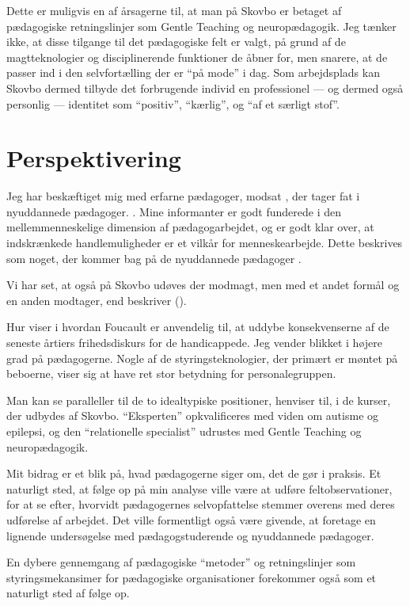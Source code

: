 Dette er muligvis en af årsagerne til, at man på Skovbo er betaget af pædagogiske retningslinjer som Gentle Teaching og neuropædagogik.
Jeg tænker ikke, at disse tilgange til det pædagogiske felt er valgt, på grund af de magtteknologier og disciplinerende funktioner de åbner for, men snarere, at de passer ind i den selvfortælling der er “på mode” i dag.
Som arbejdsplads kan Skovbo dermed tilbyde det forbrugende individ en professionel — og dermed også personlig — identitet som “positiv”, “kærlig”, og “af et særligt stof”.

\section{Perspektivering}
Jeg har beskæftiget mig med erfarne pædagoger, modsat \citeauthor{nielsenAttraktivPaPapiret2017}, der tager fat i nyuddannede pædagoger. .
Mine informanter er godt funderede i den mellemmenneskelige dimension af pædagogarbejdet, og er godt klar over, at indskrænkede handlemuligheder er et vilkår for menneskearbejde.
Dette beskrives som noget, der kommer bag på de nyuddannede pædagoger \autocite[225f]{nielsenAttraktivPaPapiret2017}.

Vi har set, at også på Skovbo udøves der modmagt, men med et andet formål og en anden modtager, end \citeauthor{dreyerespersenBekymrendeIdentiteterAnbragte2010} beskriver (\citeyear{dreyerespersenBekymrendeIdentiteterAnbragte2010}).

Hur viser i  hvordan Foucault er anvendelig til, at uddybe konsekvenserne af de seneste årtiers frihedsdiskurs for de handicappede.
Jeg vender blikket i højere grad på pædagogerne.
Nogle af de styringsteknologier, der primært er møntet på beboerne, viser sig at have ret stor betydning for personalegruppen.

Man kan se paralleller til de to idealtypiske positioner, \citeauthor{meyer-johansenFagligeOrienteringerSocialspecialpaedagogisk2018}
henviser til, i de kurser, der udbydes af Skovbo.
“Eksperten” opkvalificeres med viden om autisme og epilepsi, og den “relationelle specialist” udrustes med Gentle Teaching og neuropædagogik.

Mit bidrag er et blik på, hvad pædagogerne siger om, det de gør i praksis.
Et naturligt sted, at følge op på min analyse ville være at udføre feltobservationer, for at se efter, hvorvidt pædagogernes selvopfattelse stemmer overens med deres udførelse af arbejdet.
Det ville formentligt også være givende, at foretage en lignende undersøgelse med pædagogstuderende og nyuddannede pædagoger.


En dybere gennemgang af pædagogiske “metoder” og retningslinjer som styringsmekansimer for pædagogiske organisationer forekommer også som et naturligt sted af følge op.

